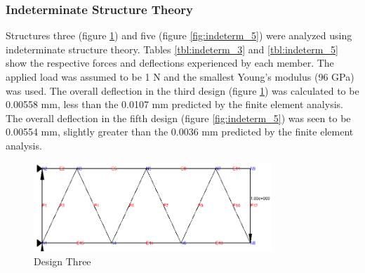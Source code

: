 \subsubsection{Indeterminate Structure Theory}

Structures three (figure \ref{fig:indeterm_3}) and five (figure \ref{fig:indeterm_5}) were analyzed using indeterminate structure theory. 
Tables \ref{tbl:indeterm_3} and \ref{tbl:indeterm_5} show the respective forces and deflections experienced by each member.
The applied load was assumed to be 1 N and the smallest Young's modulus (96 GPa) was used. %
The overall deflection in the third design (figure \ref{fig:indeterm_3}) was calculated to be 0.00558 mm, less than the 0.0107 mm predicted by the finite element analysis.
The overall deflection in the fifth design (figure \ref{fig:indeterm_5}) was seen to be 0.00554 mm, slightly greater than the 0.0036 mm predicted by the finite element analysis.

\begin{figure}[p]
    \centering
    \includegraphics[width=0.8\textwidth]{images/truss3_given}
    \caption{Design Three}
    \label{fig:indeterm_3}
\end{figure}

